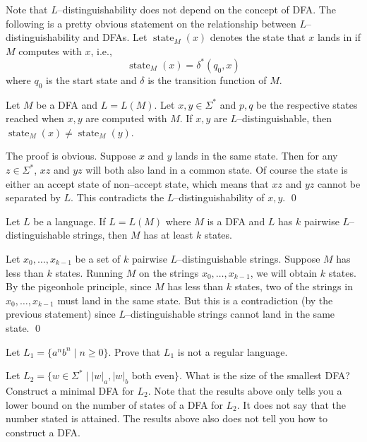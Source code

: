\newpage
Note that $L$--distinguishability does not depend on the concept of DFA.
The following is a pretty obvious statement on
the relationship between $L$--distinguishability and DFAs.
Let $\operatorname{state}_M(x)$ denotes the state that $x$ lands in
if $M$ computes with $x$, i.e.,
\[
\operatorname{state}_M(x) = \delta^*(q_0, x)
\]
where $q_0$ is the start state and
$\delta$ is the transition function 
of $M$.

\begin{prop}
  Let $M$ be a DFA and $L = L(M)$.
  Let $x, y \in \Sigma^*$ and $p,q$ be the respective states reached when
  $x,y$ are computed with $M$.
  If $x,y$ are $L$--distinguishable, then $\operatorname{state}_M(x) \neq \operatorname{state}_M(y)$. 
\end{prop}
\proof
The proof is obvious.
Suppose $x$ and $y$ lands in the same state.
Then for any $z \in \Sigma^*$, $xz$ and $yz$ will both also land in a common state.
Of course the state is either an accept state of non--accept state,
which means that $xz$ and $yz$ cannot be separated by $L$.
This contradicts the $L$--distinguishability of $x,y$.
\qed

\begin{prop}
  Let $L$ be a language.
  If $L = L(M)$ where $M$ is a DFA and $L$ has $k$ pairwise $L$--distinguishable strings,
  then $M$ has at least $k$ states.
\end{prop}
\proof
Let $x_0, \ldots, x_{k-1}$ be a set of $k$ pairwise $L$--distinguishable strings.
Suppose $M$ has less than $k$ states.
Running $M$ on the strings $x_0, \ldots, x_{k-1}$, we will obtain $k$ states.
By the pigeonhole principle, since $M$ has less than $k$ states,
two of the strings in $x_0, \ldots, x_{k-1}$ must land in the same state.
But this is a contradiction (by the previous statement) since $L$--distinguishable strings
cannot land in the same state.
\qed

\newpage
\begin{ex}
  \begin{tightlist}
  \item Let $L_1 = \{a^n b^n \mid n \geq 0\}$.
    Prove that $L_1$ is not a regular language.
  \item
    Let $L_2 = \{w \in \Sigma^* \mid |w|_a, |w|_b \text{ both even}\}$.
    What is the size of the smallest DFA?
    Construct a minimal DFA for $L_2$.
    Note that the results above only tells you a lower bound
    on the number of states of a DFA for $L_2$.
    It does not say that the number stated is attained.
    The results above also does not tell you how to construct a DFA.
  \end{tightlist}
\end{ex}

